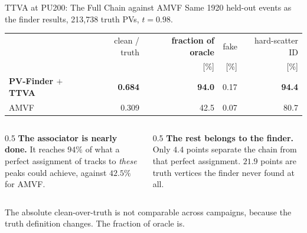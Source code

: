 \documentclass[xcolor=table,aspectratio=169]{beamer}
\begin{document}
\begin{frame}{TTVA at PU200: The Full Chain against AMVF}
    \vfill
    \small
    Same 1920 held-out events as the finder results, 213{,}738 truth PVs, $t=0.98$.
    \vspace{0.8em}

    \begin{center}
    \setlength{\tabcolsep}{9pt}
    \begin{tabular}{l rrrr}
        \toprule
        & clean / truth & \textbf{fraction of oracle} & fake & hard-scatter ID \\
        & & \textcolor{black!55}{[\%]} & \textcolor{black!55}{[\%]} & \textcolor{black!55}{[\%]} \\
        \midrule
        \rowcolor{black!8}
        \textbf{PV-Finder $+$ TTVA} & \textbf{0.684} & \textcolor{pennred}{\textbf{94.0}} & 0.17 & \textbf{94.4} \\
        AMVF & 0.309 & 42.5 & 0.07 & 80.7 \\
        \bottomrule
    \end{tabular}
    \end{center}
    \vspace{0.9em}

    \begin{columns}[t]
        \begin{column}{0.5\linewidth}
            \textbf{The associator is nearly done.} It reaches $94\%$ of what a perfect
            assignment of tracks to \emph{these} peaks could achieve, against $42.5\%$
            for AMVF.
        \end{column}
        \begin{column}{0.5\linewidth}
            \textbf{The rest belongs to the finder.} Only $4.4$ points separate the
            chain from that perfect assignment. $21.9$ points are truth vertices the
            finder never found at all.
        \end{column}
    \end{columns}
    \vspace{0.5em}

    \centering
    {\scriptsize\textcolor{black!55}{The absolute clean-over-truth is not comparable
    across campaigns, because the truth definition changes. The fraction of oracle is.}}
    \vfill
\end{frame}

\end{document}

